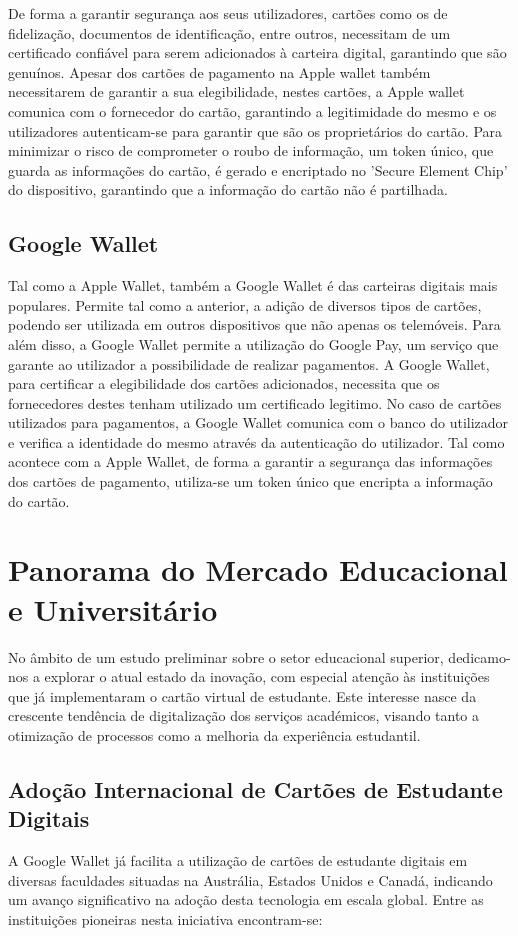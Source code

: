 \documentclass{article}
\begin{document}
De forma a garantir segurança aos seus utilizadores, cartões como os de fidelização, documentos de identificação, entre outros, necessitam de um certificado confiável para serem adicionados à carteira digital, garantindo que são genuínos.
Apesar dos cartões de pagamento na Apple wallet também necessitarem de garantir a sua elegibilidade, nestes cartões, a Apple wallet comunica com o fornecedor do cartão, garantindo a legitimidade do mesmo e os utilizadores autenticam-se para garantir que são os proprietários do cartão. Para minimizar o risco de comprometer o roubo de informação, um token único, que guarda as informações do cartão, é gerado e encriptado no 'Secure Element Chip' do dispositivo, garantindo que a informação do cartão não é partilhada.


\subsection{Google Wallet}
Tal como a Apple Wallet, também a Google Wallet é das carteiras digitais mais populares. Permite tal como a anterior, a adição de diversos tipos de cartões, podendo ser utilizada em outros dispositivos que não apenas os telemóveis. Para além disso, a Google Wallet permite a utilização do Google Pay, um serviço que garante ao utilizador a possibilidade de realizar pagamentos.
A Google Wallet, para certificar a elegibilidade dos cartões adicionados, necessita que os fornecedores destes tenham utilizado um certificado legitimo. No caso de cartões utilizados para pagamentos, a Google Wallet comunica com o banco do utilizador e verifica a identidade do mesmo através da autenticação do utilizador. Tal como acontece com a Apple Wallet, de forma a garantir a segurança das informações dos cartões de pagamento, utiliza-se um token único que encripta a informação do cartão.

\section{Panorama do Mercado Educacional e Universitário}
No âmbito de um estudo preliminar sobre o setor educacional superior, dedicamo-nos a explorar o atual estado da inovação, com especial atenção às instituições
que já implementaram o cartão virtual de estudante. Este interesse nasce da
crescente tendência de digitalização dos serviços académicos, visando tanto a
otimização de processos como a melhoria da experiência estudantil.

\subsection{Adoção Internacional de Cartões de Estudante Digitais}
A Google Wallet já facilita a utilização de cartões de estudante digitais em
diversas faculdades situadas na Austrália, Estados Unidos e Canadá, indicando
um avanço significativo na adoção desta tecnologia em escala global. Entre as
instituições pioneiras nesta iniciativa encontram-se:
\end{document}
